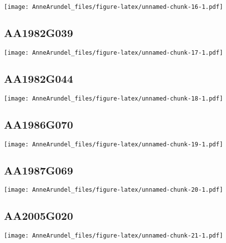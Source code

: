 \documentclass[
]{article}
\begin{document}
\texttt{[image: AnneArundel\_files/figure-latex/unnamed-chunk-16-1.pdf]}

\hypertarget{aa1982g039}{%
\subsection{AA1982G039}\label{aa1982g039}}

\texttt{[image: AnneArundel\_files/figure-latex/unnamed-chunk-17-1.pdf]}

\hypertarget{aa1982g044}{%
\subsection{AA1982G044}\label{aa1982g044}}

\texttt{[image: AnneArundel\_files/figure-latex/unnamed-chunk-18-1.pdf]}

\hypertarget{aa1986g070}{%
\subsection{AA1986G070}\label{aa1986g070}}

\texttt{[image: AnneArundel\_files/figure-latex/unnamed-chunk-19-1.pdf]}

\hypertarget{aa1987g069}{%
\subsection{AA1987G069}\label{aa1987g069}}

\texttt{[image: AnneArundel\_files/figure-latex/unnamed-chunk-20-1.pdf]}

\hypertarget{aa2005g020}{%
\subsection{AA2005G020}\label{aa2005g020}}

\texttt{[image: AnneArundel\_files/figure-latex/unnamed-chunk-21-1.pdf]}
\end{document}
